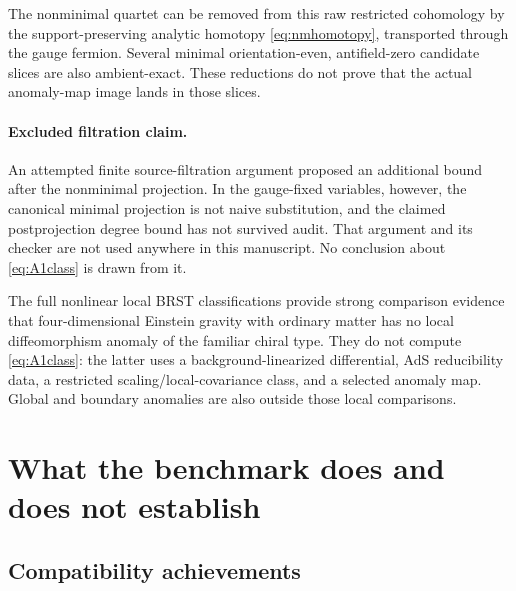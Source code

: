 \documentclass[11pt]{article}
\theoremstyle{definition}
\theoremstyle{remark}
\begin{document}
The nonminimal quartet can be removed from this raw restricted cohomology by the
support-preserving analytic homotopy \cref{eq:nmhomotopy}, transported through the
gauge fermion.  Several minimal orientation-even, antifield-zero candidate slices are
also ambient-exact.  These reductions do not prove that the actual anomaly-map image
lands in those slices.

\paragraph{Excluded filtration claim.}
An attempted finite source-filtration argument proposed an additional bound after the
nonminimal projection.  In the gauge-fixed variables, however, the canonical minimal
projection is not naive substitution, and the claimed postprojection degree bound has
not survived audit.  That argument and its checker are not used anywhere in this
manuscript.  No conclusion about \cref{eq:A1class} is drawn from it.

The full nonlinear local BRST classifications
\cite{BarnichBrandtHenneaux1995,BarnichBrandtHenneaux2000} provide strong comparison
evidence that four-dimensional Einstein gravity with ordinary matter has no local
diffeomorphism anomaly of the familiar chiral type.  They do not compute
\cref{eq:A1class}: the latter uses a background-linearized differential, AdS
reducibility data, a restricted scaling/local-covariance class, and a selected anomaly
map.  Global and boundary anomalies are also outside those local comparisons.

\section{What the benchmark does and does not establish}

\subsection{Compatibility achievements}
\end{document}
